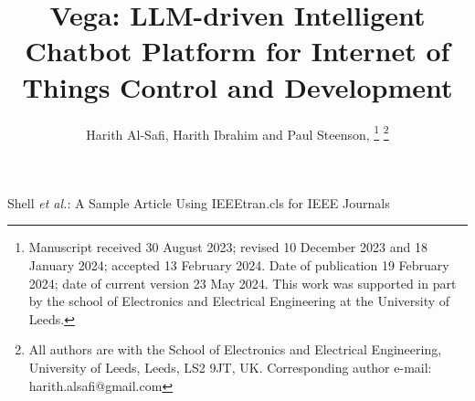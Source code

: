 \documentclass[lettersize,journal]{IEEEtran}
\begin{document}
\title{Vega: LLM-driven Intelligent Chatbot Platform for Internet of Things Control and Development}

\author{Harith Al-Safi, Harith Ibrahim and Paul Steenson, 
\thanks{Manuscript received 30 August 2023; revised 10 December 2023
and 18 January 2024; accepted 13 February 2024. Date of publication
19 February 2024; date of current version 23 May 2024. This work was supported in part by the school of Electronics and Electrical Engineering at the University of Leeds.} 
\thanks{All authors are with the School of Electronics and Electrical Engineering, University of Leeds, Leeds, LS2 9JT, UK. Corresponding author e-mail: harith.alsafi@gmail.com}}

%
{Shell \MakeLowercase{\textit{et al.}}: A Sample Article Using IEEEtran.cls for IEEE Journals}


\maketitle
\end{document}
